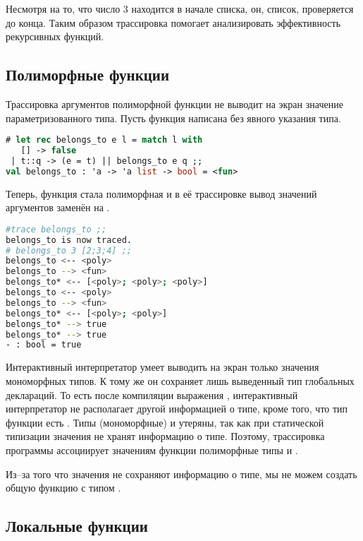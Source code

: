 Несмотря на то, что число 3 находится в начале списка, он, список, проверяется 
до конца. Таким образом трассировка помогает анализировать эффективность 
рекурсивных функций.

\subsection {Полиморфные функции}
\label{subsubsec:polymorphic_functions}

Трассировка аргументов полиморфной функции не выводит на экран значение 
параметризованного типа. Пусть функция  написана без явного 
указания типа.

\begin{lstlisting}[language=OCaml]
# let rec belongs_to e l = match l with 
   [] -> false
 | t::q -> (e = t) || belongs_to e q ;;
val belongs_to : 'a -> 'a list -> bool = <fun>
\end{lstlisting}

Теперь, функция  стала полиморфная и в её трассировке вывод 
значений аргументов заменён на .

\begin{lstlisting}[language=Bash]
#trace belongs_to ;;
belongs_to is now traced.
# belongs_to 3 [2;3;4] ;;
belongs_to <-- <poly>
belongs_to --> <fun>
belongs_to* <-- [<poly>; <poly>; <poly>]
belongs_to <-- <poly>
belongs_to --> <fun>
belongs_to* <-- [<poly>; <poly>]
belongs_to* --> true
belongs_to* --> true
- : bool = true
\end{lstlisting}

Интерактивный интерпретатор умеет выводить на экран только значения мономорфных 
типов. К тому же он сохраняет лишь выведенный тип глобальных деклараций. То есть 
после компиляции выражения , интерактивный 
интерпретатор не располагает другой информацией о типе, кроме того, что тип 
функции  есть . Типы (мономорфные) 
 и \type{[2;3;4]} утеряны, так как при статической типизации значения 
не хранят информацию о типе. Поэтому, трассировка программы ассоциирует 
значениям функции  полиморфные типы  и .

Из--за того что значения не сохраняют информацию о типе, мы не можем создать
общую функцию  с типом .

\subsection {Локальные функции}
\label{subsubsec:local_functions}

